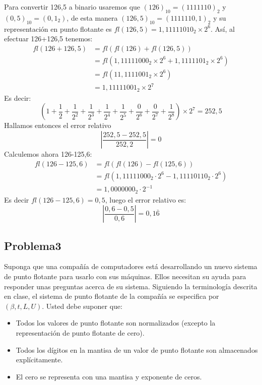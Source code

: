 \documentclass[12pt, a4paper]{article}%
\begin{document}
\begin{itemize}
\begin{solution}
\begin{itemize}
            Para convertir 126,5 a binario usaremos que $(126)_{10}=(1111110)_{2}$ y $(0,5)_{10}=(0,1_{2})$, de esta manera $(126,5)_{10}=(1111110,1)_{2}$ y su representación en punto flotante es $fl(126,5)=1,11111010_{2}\times2^6$. Así, al efectuar 126+126,5 tenemos:
            \begin{align*}
                fl(126+126,5)&=fl(fl(126)+fl(126,5))\\
                &=fl(1,11111000_{2}\times2^{6}+1,1111101_{2}\times2^{6})\\
                &=fl(11,1111001_{2}\times2^{6})\\
                &=1,11111001_{2}\times2^{7}
            \end{align*}
            Es decir:
            \[
            \left(1+\frac{1}{2}+\frac{1}{2^{2}}+\frac{1}{2^{3}}+\frac{1}{2^{4}}+\frac{1}{2^{5}}+\frac{0}{2^{6}}+\frac{0}{2^{7}}+\frac{1}{2^{8}}\right)\times2^{7}=252,5
            \]
            Hallamos entonces el error relativo
            \[
            \left|\frac{252,5-252,5}{252,2}\right|= 0
            \]
            Calculemos ahora 126-125,6:
            \begin{align*}
                fl(126-125,6)&=fl(fl(126)-fl(125,6))\\
                &=fl(1,11111000_{2}\cdot2^{6}-1,11110110_{2}\cdot2^{6})\\
                &=1,0000000_{2}\cdot2^{-1}
            \end{align*}
            Es decir $fl(126-125,6)=0,5$, luego el error relativo es:
            \[
            \left|\frac{0,6-0,5}{0,6}\right|=0,1\overline{6}
            \]
        \end{itemize}
    \end{solution}
\end{itemize}

\subsection*{Problema3}
Suponga que una compañía de computadores está desarrollando un nuevo sistema de punto flotante para usarlo con sus máquinas. Ellos necesitan su ayuda para responder unas preguntas acerca de su sistema. Siguiendo la terminología descrita en clase, el sistema de punto flotante de la compañía se especifica por \( (\beta, t, L, U) \). Usted debe suponer que:

\begin{itemize}
    \item Todos los valores de punto flotante son normalizados (excepto la representación de punto flotante de cero).
    \item Todos los dígitos en la mantisa de un valor de punto flotante son almacenados explícitamente.
    \item El cero se representa con una mantisa y exponente de ceros.
\end{itemize}
\end{document}
